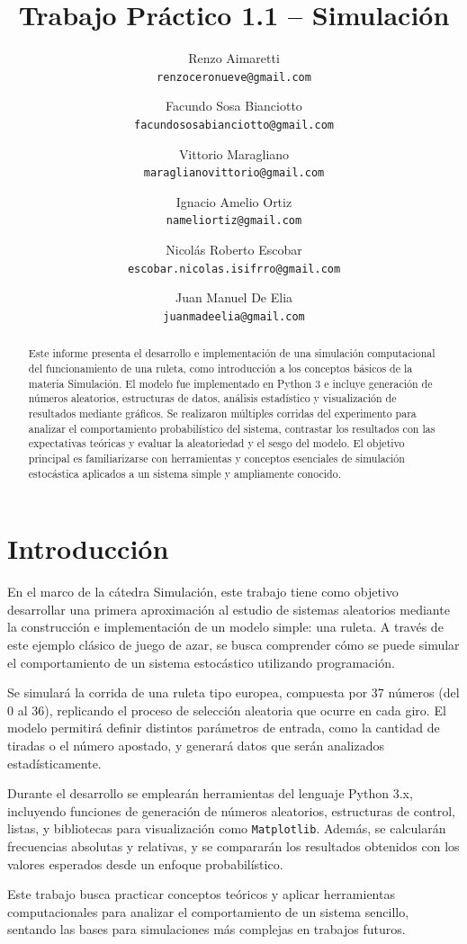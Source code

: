 \documentclass{article}
\title{Trabajo Práctico 1.1 -- Simulación}
\author{
    Renzo Aimaretti \\ \texttt{renzoceronueve@gmail.com}
    \and
    Facundo Sosa Bianciotto \\ \texttt{facundososabianciotto@gmail.com}
    \and
    Vittorio Maragliano \\ \texttt{maraglianovittorio@gmail.com}
    \and
    Ignacio Amelio Ortiz \\ \texttt{nameliortiz@gmail.com}
    \and
    Nicolás Roberto Escobar \\ \texttt{escobar.nicolas.isifrro@gmail.com}
    \and
    Juan Manuel De Elia \\ \texttt{juanmadeelia@gmail.com}
}
\begin{document}
\maketitle

\begin{abstract}
Este informe presenta el desarrollo e implementación de una simulación computacional del funcionamiento de una ruleta, como introducción a los conceptos básicos de la materia Simulación. El modelo fue implementado en Python 3 e incluye generación de números aleatorios, estructuras de datos, análisis estadístico y visualización de resultados mediante gráficos. Se realizaron múltiples corridas del experimento para analizar el comportamiento probabilístico del sistema, contrastar los resultados con las expectativas teóricas y evaluar la aleatoriedad y el sesgo del modelo. El objetivo principal es familiarizarse con herramientas y conceptos esenciales de simulación estocástica aplicados a un sistema simple y ampliamente conocido.
\end{abstract}

\section{Introducción}
En el marco de la cátedra Simulación, este trabajo tiene como objetivo desarrollar una primera aproximación al estudio de sistemas aleatorios mediante la construcción e implementación de un modelo simple: una ruleta. A través de este ejemplo clásico de juego de azar, se busca comprender cómo se puede simular el comportamiento de un sistema estocástico utilizando programación.

Se simulará la corrida de una ruleta tipo europea, compuesta por 37 números (del 0 al 36), replicando el proceso de selección aleatoria que ocurre en cada giro. El modelo permitirá definir distintos parámetros de entrada, como la cantidad de tiradas o el número apostado, y generará datos que serán analizados estadísticamente.

Durante el desarrollo se emplearán herramientas del lenguaje Python 3.x, incluyendo funciones de generación de números aleatorios, estructuras de control, listas, y bibliotecas para visualización como \texttt{Matplotlib}. Además, se calcularán frecuencias absolutas y relativas, y se compararán los resultados obtenidos con los valores esperados desde un enfoque probabilístico.

Este trabajo busca practicar conceptos teóricos y aplicar herramientas computacionales para analizar el comportamiento de un sistema sencillo, sentando las bases para simulaciones más complejas en trabajos futuros.
\end{document}
